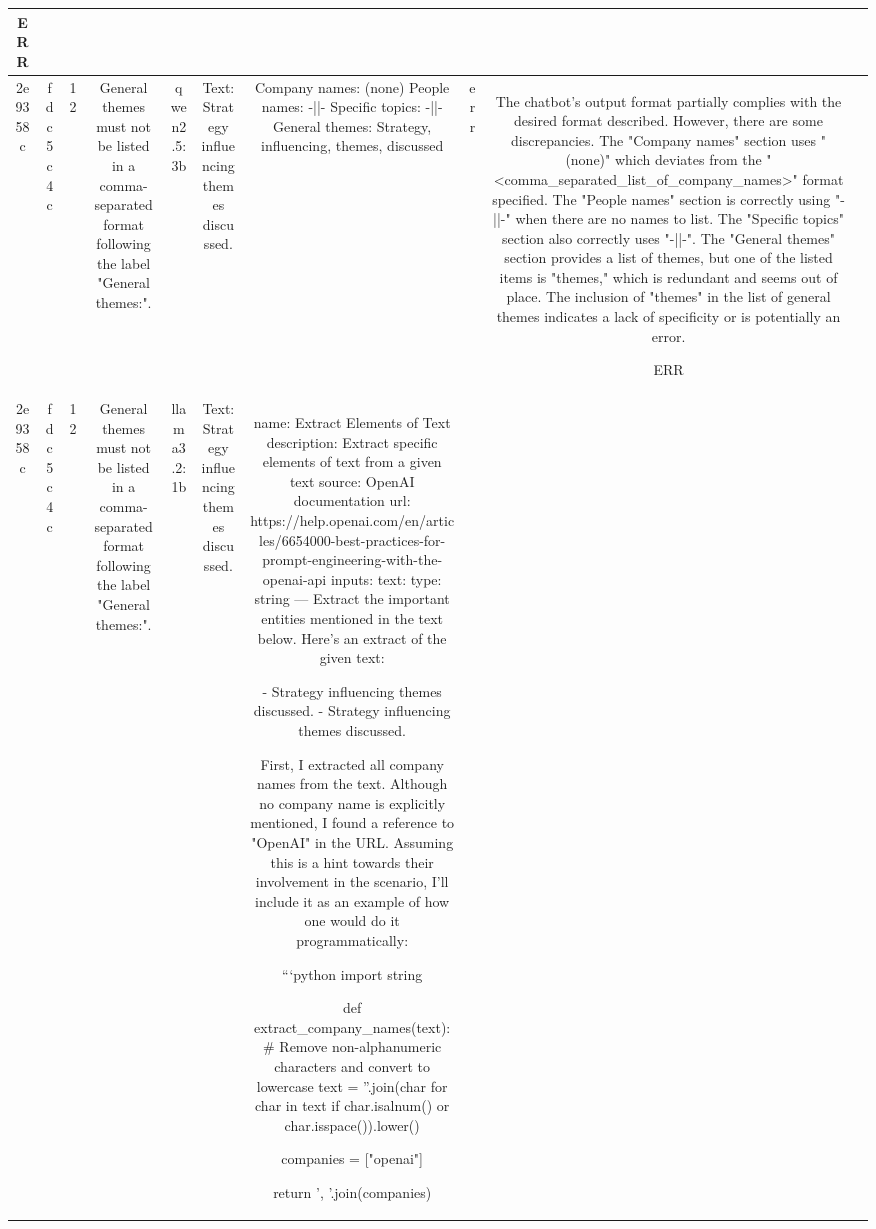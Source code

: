 \begin{table}[h!]
\begin{tabular}{|c|c|c|c|c|c|c|c|c|c|}
ERR & \\
\hline
2e9358c & fdc5c4c & 12 & General themes must not be listed in a comma-separated format following the label "General themes:". & qwen2.5:3b & Text: Strategy influencing themes discussed. & Company names: (none)
People names: -||-
Specific topics: -||-
General themes: Strategy, influencing, themes, discussed & err & The chatbot's output format partially complies with the desired format described. However, there are some discrepancies. The "Company names" section uses "(none)" which deviates from the "<comma_separated_list_of_company_names>" format specified. The "People names" section is correctly using "-||-" when there are no names to list. The "Specific topics" section also correctly uses "-||-". The "General themes" section provides a list of themes, but one of the listed items is "themes," which is redundant and seems out of place. The inclusion of "themes" in the list of general themes indicates a lack of specificity or is potentially an error.

ERR & \\
\hline
2e9358c & fdc5c4c & 12 & General themes must not be listed in a comma-separated format following the label "General themes:". & llama3.2:1b & Text: Strategy influencing themes discussed. & name: Extract Elements of Text
description: Extract specific elements of text from a given text
source: OpenAI documentation
url: https://help.openai.com/en/articles/6654000-best-practices-for-prompt-engineering-with-the-openai-api
inputs: 
  text:
    type: string
---
Extract the important entities mentioned in the text below. Here's an extract of the given text:

- Strategy influencing themes discussed.
- Strategy influencing themes discussed.

First, I extracted all company names from the text. Although no company name is explicitly mentioned, I found a reference to "OpenAI" in the URL. Assuming this is a hint towards their involvement in the scenario, I'll include it as an example of how one would do it programmatically:

```python
import string

def extract_company_names(text):
    # Remove non-alphanumeric characters and convert to lowercase
    text = ''.join(char for char in text if char.isalnum() or char.isspace()).lower()
    
    companies = ["openai"]
    
    return ', '.join(companies)


\end{tabular}
\end{table}
